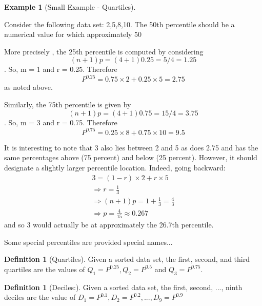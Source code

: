 \documentclass[10pt,]{book}
\theoremstyle{plain}
\theoremstyle{definition}
\newtheorem{definition}[theorem]{Definition}
\theoremstyle{definition}
\newtheorem{example}[theorem]{Example}
\theoremstyle{definition}
\numberwithin{equation}{section}
\begin{document}
\begin{example}[Small Example - Quartiles]\label{example-3}

Consider the following data set: {2,5,8,10}. The 50th percentile should be a numerical value for which approximately 50%
\par
More precisely	, the 25th percentile is computed by considering 
		\begin{equation*}(n+1)p = (4+1)0.25 = 5/4 = 1.25\end{equation*}.  
		So, m = 1 and r = 0.25. Therefore 
		\begin{equation*}P^{0.25} = 0.75 \times 2 + 0.25 \times 5 = 2.75\end{equation*} 
		as noted above. 
\par

		Similarly, the 75th percentile is given by
		\begin{equation*}(n+1)p = (4+1)0.75 = 15/4 = 3.75\end{equation*}.  
		So, m = 3 and r = 0.75. Therefore 
		\begin{equation*}P^{0.75} = 0.25 \times 8 + 0.75 \times 10 = 9.5\end{equation*} 
		
		It is interesting to note that 3 also lies between 2 and 5 as does 2.75 and has the same percentages above (75 percent) and below (25 percent). However, it should designate a slightly larger percentile location. Indeed, going backward:
		\begin{gather*}
3 = (1-r) \times 2 + r \times 5\\
\Rightarrow r = \frac{1}{3}\\
\Rightarrow (n+1)p = 1 + \frac{1}{3} = \frac{4}{3}\\
\Rightarrow p = \frac{4}{15} \approx 0.267
\end{gather*}
		and so 3 would actually be at approximately the 26.7th percentile.
\end{example}
\par
Some special percentiles are provided special names...
\begin{definition}[{Quartiles}]\label{definition-4}
Given a sorted data set, the first, second, and third quartiles are the values of 
	\(Q_1 = P^{0.25}, Q_2 = P^{0.5}\) and \(Q_3 = P^{0.75}\).
\end{definition}
\begin{definition}[{Deciles:}]\label{definition-5}
Given a sorted data set, the first, second, ..., ninth deciles are the value of 
	\(D_1 = P^{0.1}, D_2 = P^{0.2}, ... , D_9 = P^{0.9}\)
\end{definition}
\par
\end{document}
